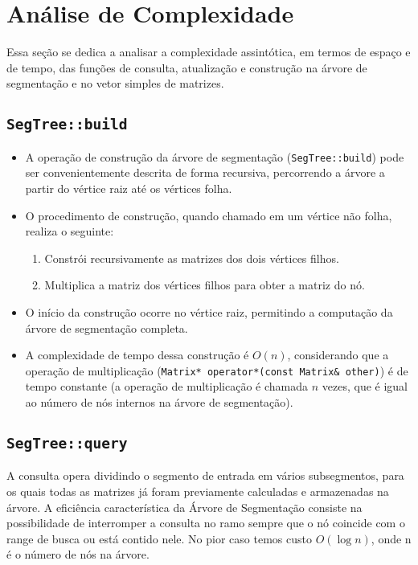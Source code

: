 \documentclass{article}
\begin{document}
\section{Análise de Complexidade}
Essa seção se dedica a analisar a complexidade assintótica, em termos de espaço e de tempo, das funções de consulta, atualização e construção na árvore de segmentação e no vetor simples de matrizes.

\subsection{\texttt{SegTree::build}}
\begin{itemize}
    \item A operação de construção da árvore de segmentação (\texttt{SegTree::build}) pode ser convenientemente descrita de forma recursiva, percorrendo a árvore a partir do vértice raiz até os vértices folha.
    \item O procedimento de construção, quando chamado em um vértice não folha, realiza o seguinte:
        \begin{enumerate}
            \item Constrói recursivamente as matrizes dos dois vértices filhos.
            \item Multiplica a matriz dos vértices filhos para obter a matriz do nó.
        \end{enumerate}
    \item O início da construção ocorre no vértice raiz, permitindo a computação da árvore de segmentação completa.
    \item A complexidade de tempo dessa construção é \(O(n)\), considerando que a operação de multiplicação (\texttt{Matrix* operator*(const Matrix\& other)}) é de tempo constante (a operação de multiplicação é chamada \(n\) vezes, que é igual ao número de nós internos na árvore de segmentação).
\end{itemize}


\subsection{\texttt{SegTree::query}}
A consulta opera dividindo o segmento de entrada em vários subsegmentos, para os quais todas as matrizes já foram previamente calculadas e armazenadas na árvore. A eficiência característica da Árvore de Segmentação consiste na possibilidade de interromper a consulta no ramo sempre que o nó coincide com o range de busca ou está contido nele. No pior caso temos custo  \(O(\log n)\), onde n é o número de nós na árvore.
\end{document}
